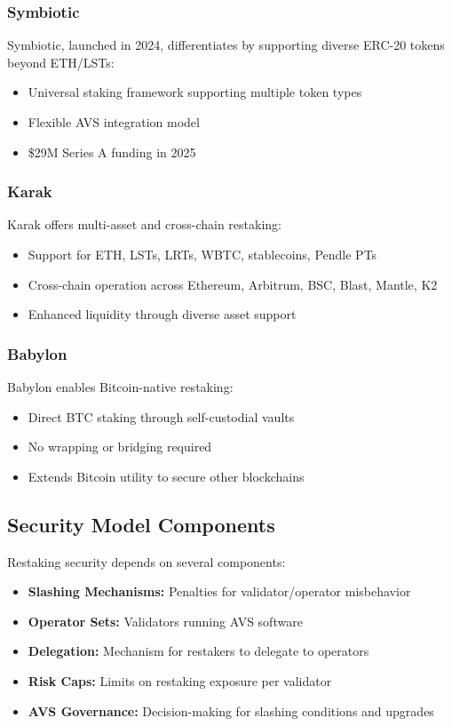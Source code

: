 \documentclass[runningheads]{llncs}
\begin{document}
\subsubsection{Symbiotic}

Symbiotic, launched in 2024, differentiates by supporting diverse ERC-20 tokens beyond ETH/LSTs:
\begin{itemize}
    \item Universal staking framework supporting multiple token types
    \item Flexible AVS integration model
    \item \$29M Series A funding in 2025
\end{itemize}

\subsubsection{Karak}

Karak offers multi-asset and cross-chain restaking:
\begin{itemize}
    \item Support for ETH, LSTs, LRTs, WBTC, stablecoins, Pendle PTs
    \item Cross-chain operation across Ethereum, Arbitrum, BSC, Blast, Mantle, K2
    \item Enhanced liquidity through diverse asset support
\end{itemize}

\subsubsection{Babylon}

Babylon enables Bitcoin-native restaking:
\begin{itemize}
    \item Direct BTC staking through self-custodial vaults
    \item No wrapping or bridging required
    \item Extends Bitcoin utility to secure other blockchains
\end{itemize}

\subsection{Security Model Components}

Restaking security depends on several components:

\begin{itemize}
    \item \textbf{Slashing Mechanisms:} Penalties for validator/operator misbehavior
    \item \textbf{Operator Sets:} Validators running AVS software
    \item \textbf{Delegation:} Mechanism for restakers to delegate to operators
    \item \textbf{Risk Caps:} Limits on restaking exposure per validator
    \item \textbf{AVS Governance:} Decision-making for slashing conditions and upgrades
\end{itemize}
\end{document}
